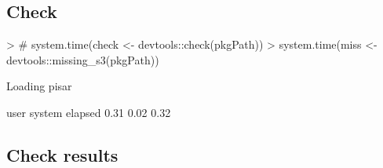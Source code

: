 \documentclass[a4paper,12pt]{article}\usepackage[]{graphicx}\usepackage[]{color}
\begin{document}
\subsection{Check}
\begin{Schunk}
\begin{Sinput}
> # system.time(check <- devtools::check(pkgPath))
> system.time(miss <- devtools::missing_s3(pkgPath))
\end{Sinput}
\begin{Soutput}
Loading pisar
\end{Soutput}
\begin{Soutput}
   user  system elapsed 
   0.31    0.02    0.32 
\end{Soutput}
\end{Schunk}
\clearpage
\subsection{Check results}
\end{document}
